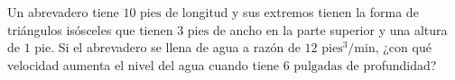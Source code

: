\item Un abrevadero tiene $10 \text{ pies}$ de longitud y sus extremos tienen la forma de triángulos isósceles que tienen $3 \text{ pies}$ de ancho en la parte superior y una altura de $1 \text{ pie}$. Si el abrevadero se llena de agua a razón de $12 \text{ pies}^3/\text{min}$, ¿con qué velocidad aumenta el nivel del agua cuando tiene $6 \text{ pulgadas}$ de profundidad?
